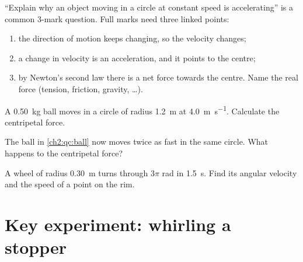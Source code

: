 \begin{examtip}
``Explain why an object moving in a circle at constant speed is accelerating''
is a common 3-mark question. Full marks need three linked points:
\begin{enumerate}
  \item the direction of motion keeps changing, so the velocity changes;
  \item a change in velocity is an acceleration, and it points to the centre;
  \item by Newton's second law there is a net force towards the centre. Name
        the real force (tension, friction, gravity, \ldots).
\end{enumerate}
\end{examtip}

\begin{quickcheck}
  \item A \qty{0.50}{kg} ball moves in a circle of radius \qty{1.2}{m} at
        \qty{4.0}{m.s^{-1}}. Calculate the centripetal force.\label{ch2:qc:ball}
  \item The ball in \cref{ch2:qc:ball} now moves twice as fast in the same circle. What
        happens to the centripetal force?
  \item A wheel of radius \qty{0.30}{m} turns through $3\pi$ rad in
        \qty{1.5}{s}. Find its angular velocity and the speed of a point on
        the rim.
\end{quickcheck}

\section{Key experiment: whirling a stopper}\label{ch2:sec:experiment}

